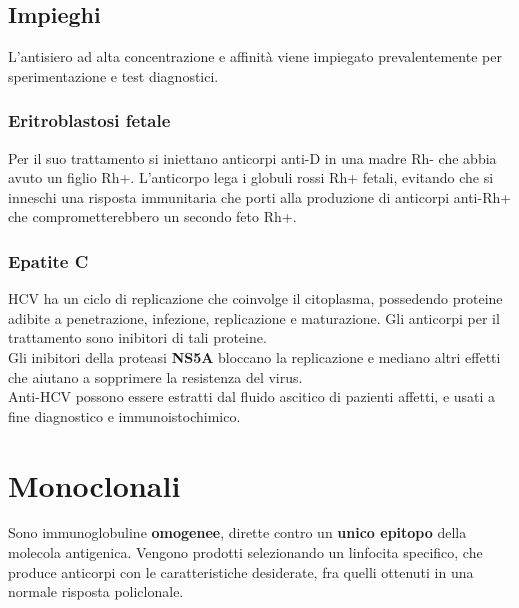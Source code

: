 \documentclass[a4paper, 12pt]{article}
\begin{document}
\subsection{Impieghi}
L'antisiero ad alta concentrazione e affinità viene impiegato prevalentemente per sperimentazione e test diagnostici.

\subsubsection{Eritroblastosi fetale}
Per il suo trattamento si iniettano anticorpi anti-D in una madre Rh- che abbia avuto un figlio Rh+. L'anticorpo lega i globuli rossi Rh+ fetali, evitando che si inneschi una risposta immunitaria che porti alla produzione di anticorpi anti-Rh+ che comprometterebbero un secondo feto Rh+.

\subsubsection{Epatite C}
HCV ha un ciclo di replicazione che coinvolge il citoplasma, possedendo proteine adibite a penetrazione, infezione, replicazione e maturazione. Gli anticorpi per il trattamento sono inibitori di tali proteine.\\
Gli inibitori della proteasi \textbf{NS5A} bloccano la replicazione e mediano altri effetti che aiutano a sopprimere la resistenza del virus.\\
Anti-HCV possono essere estratti dal fluido ascitico di pazienti affetti, e usati a fine diagnostico e immunoistochimico.

\section{Monoclonali}
Sono immunoglobuline \textbf{omogenee}, dirette contro un \textbf{unico epitopo} della molecola antigenica. Vengono prodotti selezionando un linfocita specifico, che produce anticorpi con le caratteristiche desiderate, fra quelli ottenuti in una normale risposta policlonale.
\end{document}
